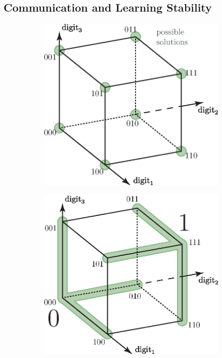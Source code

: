 \subsection{Communication and Learning Stability}
\label{sec:communication_learning_stability}

\begin{figure}[bh!]
  \centering
  \begin{subfigure}[b]{.48\textwidth}
      \includegraphics[width=\linewidth]{figures/ch_generic_approach/Boolean_Cube_8code}
      \caption{}
      \label{fig:boolen_cube_vectors_8}
  \end{subfigure}
  \hfill
  \begin{subfigure}[b]{.48\textwidth}
      \includegraphics[width=\linewidth]{figures/ch_generic_approach/Boolean_Cube_2code}

\end{subfigure}
\end{figure}

